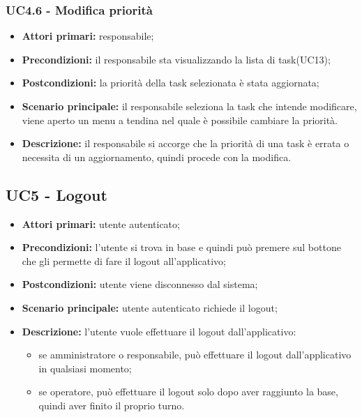 \subsubsection{UC4.6 - Modifica priorità}
\begin{itemize}
	\item 	\textbf{Attori primari:} responsabile;
	\item 	\textbf{Precondizioni:} il responsabile sta visualizzando la lista di task(UC13);
	\item 	\textbf{Postcondizioni:} la priorità della task selezionata è stata aggiornata;
	\item 	\textbf{Scenario principale:} il responsabile seleziona la task che intende modificare, viene aperto un menu a tendina nel quale è possibile cambiare la priorità.
	\item 	\textbf{Descrizione:} il responsabile si accorge che la priorità di una task è errata o necessita di un aggiornamento, quindi procede con la modifica.
\end{itemize}

\subsection{UC5 - Logout}

\begin{itemize}
	\item 	\textbf{Attori primari:} utente autenticato;
	\item 	\textbf{Precondizioni:} l’utente si trova in base e quindi può premere sul bottone che gli permette di fare il logout all’applicativo;
	\item 	\textbf{Postcondizioni:} utente viene disconnesso dal sistema;
	\item 	\textbf{Scenario principale:} utente autenticato richiede il logout;
	\item 	\textbf{Descrizione:} l’utente vuole effettuare il logout dall’applicativo:
	\begin{itemize}
		\item se amministratore o responsabile, può effettuare il logout dall’applicativo in qualsiasi momento;
		\item se operatore, può effettuare il logout solo dopo aver raggiunto la base, quindi aver finito il proprio turno.
	\end{itemize}
\end{itemize}


